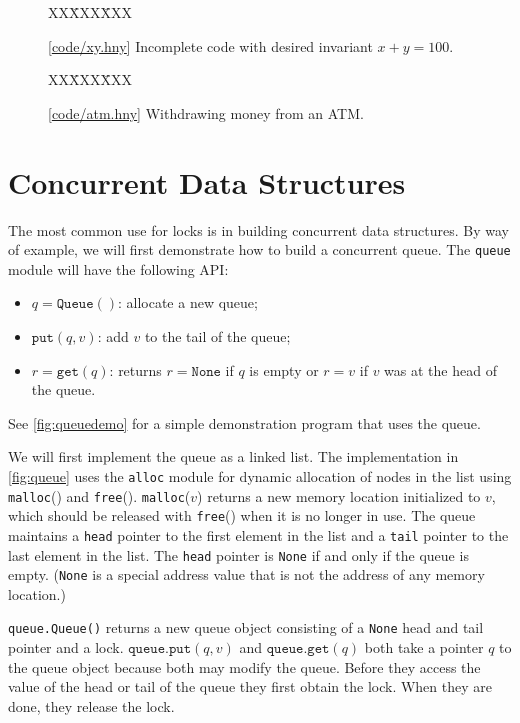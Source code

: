 \documentclass{report}
\newcommand{\harmonysource}[1]{
\begin{tabbing}
XX\=XXX\=XXX\kill
    
\end{tabbing}
}
\newcommand{\harmonylink}[1]{%
[\href{https://harmony.cs.cornell.edu/#1}{\underline{#1}}]%
}
\newenvironment{code}{
\tcolorbox
}{
\endtcolorbox
}
\begin{document}
\begin{figure}
\begin{code}
\harmonysource{xy}
\end{code}
\caption{\harmonylink{code/xy.hny} Incomplete code with desired invariant $x + y = 100$.}
\label{fig:xy}
\end{figure}

\begin{figure}
\begin{code}
\harmonysource{atm}
\end{code}
\caption{\harmonylink{code/atm.hny} Withdrawing money from an ATM.}
\label{fig:atm}
\end{figure}

\chapter{Concurrent Data Structures}
\label{ch:cds}

The most common use for locks is in building concurrent data structures.
By way of example, we will first demonstrate how to build a concurrent queue.
The \texttt{queue} module will have the following API:
\begin{itemize}
\item $q = \mathtt{Queue}()$: allocate a new queue;
\item $\mathtt{put}(q, v)$: add $v$ to the tail of the queue;
\item $r = \mathtt{get}(q)$: returns $r = \mathtt{None}$
if $q$ is empty or $r = v$ if $v$ was at the head of the queue.
\end{itemize}

\noindent
See \autoref{fig:queuedemo} for a simple demonstration program that uses the queue.

We will first implement the queue as a linked list.
The implementation in \autoref{fig:queue}
uses the \texttt{alloc} module for dynamic allocation
%
of nodes in the list using \texttt{malloc}() and \texttt{free}().
\texttt{malloc}($v$) returns a new memory location initialized to $v$,
which should be released with \texttt{free}() when it is no longer in use.
The queue maintains a \texttt{head} pointer to the first element in the list
and a \texttt{tail} pointer to the last element in the list.
The \texttt{head} pointer is \texttt{None} if and only if the queue is empty.
(\texttt{None} is a special address value that is not the address of any
memory location.)

\texttt{queue.Queue()} returns a new queue object consisting of a \texttt{None} head
and tail pointer and a lock.
$\mathtt{queue.put}(q, v)$ and $\mathtt{queue.get}(q)$ both take a pointer $q$ to the
queue object because both may modify the queue.
Before they access the value of the head or tail of the queue they first obtain
the lock.
When they are done, they release the lock.
\end{document}
